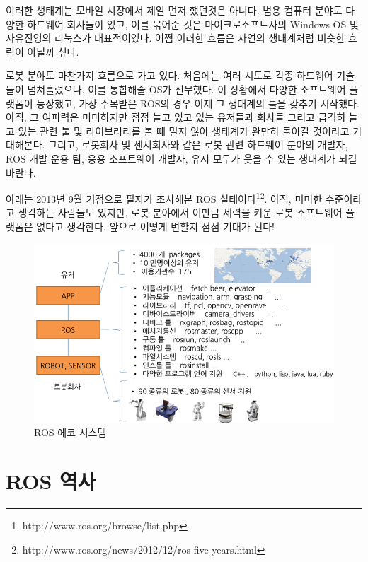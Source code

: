 이러한 생태계는 모바일 시장에서 제일 먼저 했던것은 아니다.
범용 컴퓨터 분야도 다양한 하드웨어 회사들이 있고, 이를 묶어준 것은 마이크로소프트사의 Windows OS 및 자유진영의 리눅스가 대표적이였다.
어쩜 이러한 흐름은 자연의 생태계처럼 비슷한 흐림이 아닐까 싶다. 

로봇 분야도 마찬가지 흐름으로 가고 있다.
처음에는 여러 시도로 각종 하드웨어 기술들이 넘쳐흘렀으나, 이를 통합해줄 OS가 전무했다.
이 상황에서 다양한 소프트웨어 플랫폼이 등장했고, 가장 주목받은 ROS의 경우 이제 그 생태계의 틀을 갖추기 시작했다.
아직, 그 여파력은 미미하지만 점점 늘고 있고 있는 유저들과 회사들 그리고 급격히 늘고 있는 관련 툴 및 라이브러리를 볼 때 멀지 않아 생태계가 완만히 돌아갈 것이라고 기대해본다.
그리고, 로봇회사 및 센서회사와 같은 로봇 관련 하드웨어 분야의 개발자, ROS 개발 운용 팀, 응용 소프트웨어 개발자, 유저 모두가 웃을 수 있는 생태계가 되길 바란다.
 
아래는 2013년 9월 기점으로 필자가 조사해본 ROS 실태이다\footnote{http://www.ros.org/browse/list.php}\footnote{http://www.ros.org/news/2012/12/ros-five-years.html}.
아직, 미미한 수준이라고 생각하는 사람들도 있지만, 로봇 분야에서 이만큼 세력을 키운 로봇 소프트웨어 플랫폼은 없다고 생각한다.
앞으로 어떻게 변할지 점점 기대가 된다!

\begin{figure}[h]
\centering\includegraphics[width=\columnwidth]{pictures/chapter1/ecosystem.png}
\caption{ROS 에코 시스템}
\end{figure}

\section{ROS 역사}

